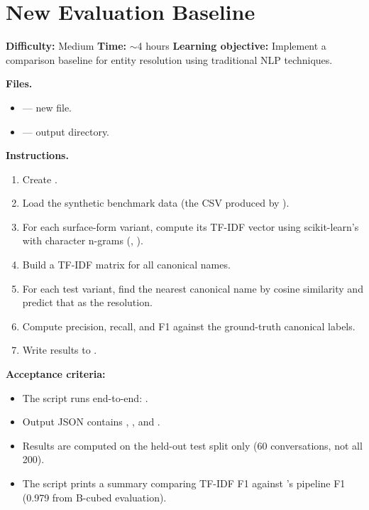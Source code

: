 \section{New Evaluation Baseline}
\label{sec:ex-new-baseline}

\noindent\textbf{Difficulty:} Medium \quad
\textbf{Time:} $\sim$4 hours \quad
\textbf{Learning objective:} Implement a comparison baseline for entity
resolution using traditional NLP techniques.

\medskip\noindent\textbf{Files.}

\begin{itemize}
    \item {} --- new file.
    \item {} --- output directory.
\end{itemize}

\medskip\noindent\textbf{Instructions.}

\begin{enumerate}
    \item Create .
    \item Load the synthetic benchmark data (the CSV produced by
          ).
    \item For each surface-form variant, compute its TF-IDF vector using
          scikit-learn's  with character n-grams
          (, ).
    \item Build a TF-IDF matrix for all canonical names.
    \item For each test variant, find the nearest canonical name by cosine
          similarity and predict that as the resolution.
    \item Compute precision, recall, and F1 against the ground-truth
          canonical labels.
    \item Write results to
          .
\end{enumerate}

\begin{tryit}
\textbf{Acceptance criteria:}
\begin{itemize}
    \item The script runs end-to-end:
          .
    \item Output JSON contains , , and .
    \item Results are computed on the held-out test split only (60
          conversations, not all 200).
    \item The script prints a summary comparing TF-IDF F1 against
          \sysname{}'s pipeline F1 (0.979 from B-cubed evaluation).
\end{itemize}
\end{tryit}

